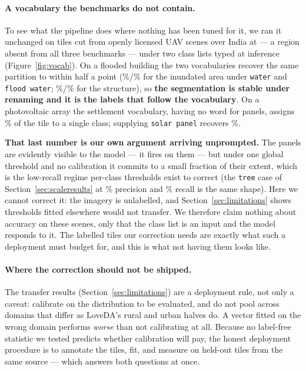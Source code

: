 \documentclass[10pt,a4paper]{article}                        %
\newcommand{\best}[1]{\textbf{#1}}
\begin{document}
\paragraph{A vocabulary the benchmarks do not contain.} To see what the
pipeline does where nothing has been tuned for it, we ran it unchanged on
\indTiles{} tiles cut from \indScenes{} openly licensed UAV scenes over India at
\indGSD{} --- a region absent from all three benchmarks --- under two class lists
typed at inference (Figure~\ref{fig:vocab}). On a flooded building the two
vocabularies recover the same partition to within half a point
(\indFloodA{}\%/\indFloodB{}\% for the inundated area under \texttt{water} and
\texttt{flood water}; \indBldgA{}\%/\indBldgB{}\% for the structure), so
\best{the segmentation is stable under renaming and it is the labels that follow
the vocabulary}. On a photovoltaic array the settlement vocabulary, having no
word for panels, assigns \indVegA{}\% of the tile to a single class; supplying
\texttt{solar panel} recovers \indSolarB{}\%.

\best{That last number is our own argument arriving unprompted.} The panels are
evidently visible to the model --- it fires on them --- but under one global
threshold and no calibration it commits to a small fraction of their extent,
which is the low-recall regime per-class thresholds exist to correct (the
\texttt{tree} case of Section~\ref{sec:scaleresults} at \treeP{}\% precision and
\treeR{}\% recall is the same shape). Here we cannot correct it: the imagery is
unlabelled, and Section~\ref{sec:limitations} shows thresholds fitted elsewhere
would not transfer. We therefore claim nothing about accuracy on these
scenes, only that the class list is an input and the model responds to it. The
\calibTiles{} labelled tiles our correction needs are exactly what such a
deployment must budget for, and this is what not having them looks like.

\paragraph{Where the correction should not be shipped.} The transfer results
(Section~\ref{sec:limitations}) are a deployment rule, not only a caveat:
calibrate on the distribution to be evaluated, and do not pool across domains that
differ as LoveDA's rural and urban halves do. A vector fitted on the wrong domain
performs \emph{worse} than not calibrating at all. Because no label-free statistic
we tested predicts whether calibration will pay, the honest deployment procedure
is to annotate the \calibTiles{} tiles, fit, and measure on held-out tiles from
the same source --- which answers both questions at once.
\end{document}
